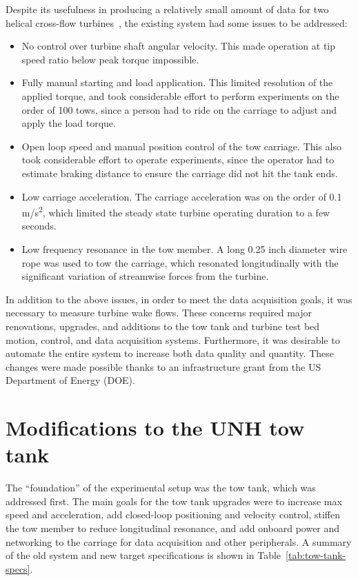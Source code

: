 Despite its usefulness in producing a relatively small amount of data for two
helical cross-flow turbines~\cite{Bachant2015-RE}, the existing system had some
issues to be addressed:
\begin{itemize}
    \item No control over turbine shaft angular velocity. This made operation at
    tip speed ratio below peak torque impossible.
    
    \item Fully manual starting and load application. This limited resolution of
    the applied torque, and took considerable effort to perform experiments on
    the order of 100 tows, since a person had to ride on the carriage to adjust
    and apply the load torque.
    
    \item Open loop speed and manual position control of the tow carriage. This
    also took considerable effort to operate experiments, since the operator had
    to estimate braking distance to ensure the carriage did not hit the tank
    ends.
    
    \item Low carriage acceleration. The carriage acceleration was on the order
    of 0.1 m/s\textsuperscript{2}, which limited the steady state turbine
    operating duration to a few seconds.
    
    \item Low frequency resonance in the tow member. A long 0.25 inch diameter
    wire rope was used to tow the carriage, which resonated longitudinally with
    the significant variation of streamwise forces from the turbine.
\end{itemize}

In addition to the above issues, in order to meet the data acquisition goals, it
was necessary to measure turbine wake flows. These concerns required major
renovations, upgrades, and additions to the tow tank and turbine test bed
motion, control, and data acquisition systems. Furthermore, it was desirable to
automate the entire system to increase both data quality and quantity. These
changes were made possible thanks to an infrastructure grant from the US
Department of Energy (DOE).


\section{Modifications to the UNH tow tank}

The ``foundation'' of the experimental setup was the tow tank, which was
addressed first. The main goals for the tow tank upgrades were to increase max
speed and acceleration, add closed-loop positioning and velocity control,
stiffen the tow member to reduce longitudinal resonance, and add onboard power
and networking to the carriage for data acquisition and other peripherals. A
summary of the old system and new target specifications is shown in
Table~\ref{tab:tow-tank-specs}.

